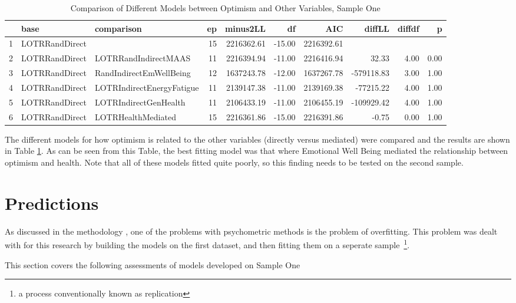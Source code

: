 \documentclass{article}
\begin{document}
\clearpage{}
\begin{table}[ht]
\centering
\begin{tabular}{rllrrrrrrr}
  \hline
 & base & comparison & ep & minus2LL & df & AIC & diffLL & diffdf & p \\ 
  \hline
1 & LOTRRandDirect &  &  15 & 2216362.61 & -15.00 & 2216392.61 &  &  &  \\ 
  2 & LOTRRandDirect & LOTRRandIndirectMAAS &  11 & 2216394.94 & -11.00 & 2216416.94 & 32.33 & 4.00 & 0.00 \\ 
  3 & LOTRRandDirect & RandIndirectEmWellBeing &  12 & 1637243.78 & -12.00 & 1637267.78 & -579118.83 & 3.00 & 1.00 \\ 
  4 & LOTRRandDirect & LOTRIndirectEnergyFatigue &  11 & 2139147.38 & -11.00 & 2139169.38 & -77215.22 & 4.00 & 1.00 \\ 
  5 & LOTRRandDirect & LOTRIndirectGenHealth &  11 & 2106433.19 & -11.00 & 2106455.19 & -109929.42 & 4.00 & 1.00 \\ 
  6 & LOTRRandDirect & LOTRHealthMediated &  15 & 2216361.86 & -15.00 & 2216391.86 & -0.75 & 0.00 & 1.00 \\ 
   \hline
\end{tabular}
\caption{Comparison of Different Models between Optimism and Other Variables, Sample One} 
\label{tab:lotrmodcomp1}
\end{table}
The different models for how optimism is related to the other variables (directly versus mediated) were compared and the results are shown in Table \ref{tab:lotrmodcomp1}. As can be seen from this Table, the best fitting model was that where Emotional Well Being mediated the relationship between optimism and health. Note that all of these models fitted quite poorly, so this finding needs to be tested on the second sample. 

\section{Predictions}
\label{sec:predictions}

As discussed in the methodology , one of the problems with psychometric methods is the problem of overfitting. This problem was dealt with for this research by building the models on the first dataset, and then fitting them on a seperate sample~\footnote{a process conventionally known as replication}. 

This section covers the following assessments of models developed on Sample One
\end{document}
